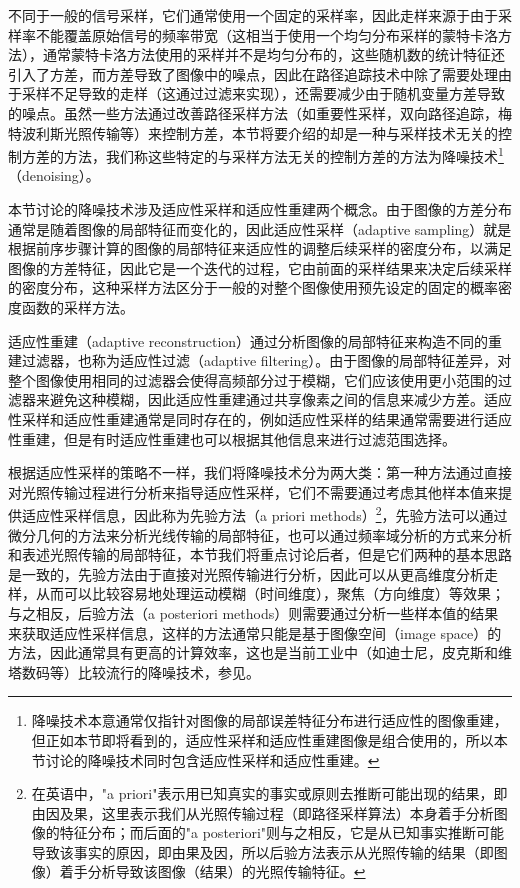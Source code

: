 不同于一般的信号采样，它们通常使用一个固定的采样率，因此走样来源于由于采样率不能覆盖原始信号的频率带宽（这相当于使用一个均匀分布采样的蒙特卡洛方法），通常蒙特卡洛方法使用的采样并不是均匀分布的，这些随机数的统计特征还引入了方差，而方差导致了图像中的噪点，因此在路径追踪技术中除了需要处理由于采样不足导致的走样（这通过过滤来实现），还需要减少由于随机变量方差导致的噪点。虽然一些方法通过改善路径采样方法（如重要性采样，双向路径追踪，梅特波利斯光照传输等）来控制方差，本节将要介绍的却是一种与采样技术无关的控制方差的方法，我们称这些特定的与采样方法无关的控制方差的方法为降噪技术\footnote{降噪技术本意通常仅指针对图像的局部误差特征分布进行适应性的图像重建，但正如本节即将看到的，适应性采样和适应性重建图像是组合使用的，所以本节讨论的降噪技术同时包含适应性采样和适应性重建。}（denoising）。

本节讨论的降噪技术涉及适应性采样和适应性重建两个概念。由于图像的方差分布通常是随着图像的局部特征而变化的，因此适应性采样（adaptive sampling）就是根据前序步骤计算的图像的局部特征来适应性的调整后续采样的密度分布，以满足图像的方差特征，因此它是一个迭代的过程，它由前面的采样结果来决定后续采样的密度分布，这种采样方法区分于一般的对整个图像使用预先设定的固定的概率密度函数的采样方法。

适应性重建（adaptive reconstruction）通过分析图像的局部特征来构造不同的重建过滤器，也称为适应性过滤（adaptive filtering）。由于图像的局部特征差异，对整个图像使用相同的过滤器会使得高频部分过于模糊，它们应该使用更小范围的过滤器来避免这种模糊，因此适应性重建通过共享像素之间的信息来减少方差。适应性采样和适应性重建通常是同时存在的，例如适应性采样的结果通常需要进行适应性重建，但是有时适应性重建也可以根据其他信息来进行过滤范围选择。

根据适应性采样的策略不一样，我们将降噪技术分为两大类：第一种方法通过直接对光照传输过程进行分析来指导适应性采样，它们不需要通过考虑其他样本值来提供适应性采样信息，因此称为先验方法（a priori methods）\footnote{在英语中，"a priori"表示用已知真实的事实或原则去推断可能出现的结果，即由因及果，这里表示我们从光照传输过程（即路径采样算法）本身着手分析图像的特征分布；而后面的"a posteriori"则与之相反，它是从已知事实推断可能导致该事实的原因，即由果及因，所以后验方法表示从光照传输的结果（即图像）着手分析导致该图像（结果）的光照传输特征。}，先验方法可以通过微分几何的方法来分析光线传输的局部特征，也可以通过频率域分析的方式来分析和表述光照传输的局部特征，本节我们将重点讨论后者，但是它们两种的基本思路是一致的，先验方法由于直接对光照传输进行分析，因此可以从更高维度分析走样，从而可以比较容易地处理运动模糊（时间维度），聚焦（方向维度）等效果；与之相反，后验方法（a posteriori methods）则需要通过分析一些样本值的结果来获取适应性采样信息，这样的方法通常只能是基于图像空间（image space）的方法，因此通常具有更高的计算效率，这也是当前工业中（如迪士尼，皮克斯和维塔数码等）比较流行的降噪技术，参见\cite{a:RecentAdvancesinAdaptiveSamplingandReconstructionforMonteCarloRendering}。








